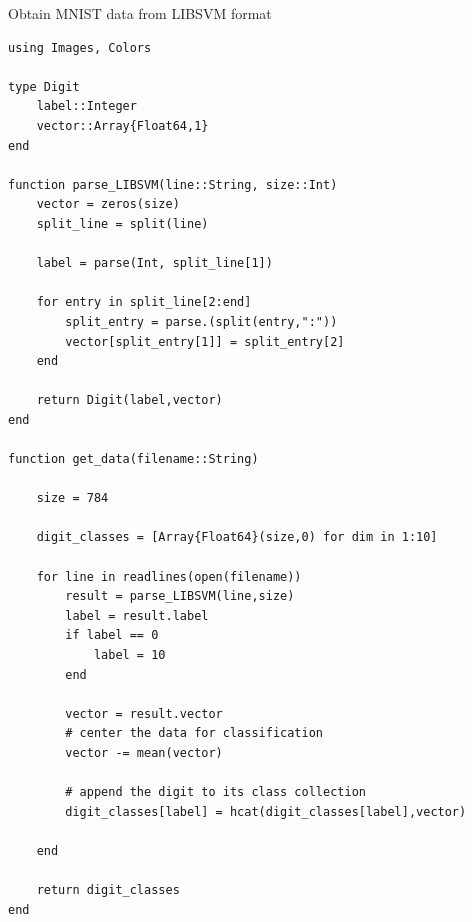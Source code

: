 \documentclass[a4paper]{article}
\begin{document}
\begin{algorithm}
\caption{Obtain MNIST data from LIBSVM format}

\begin{lstlisting}
using Images, Colors

type Digit
    label::Integer
    vector::Array{Float64,1}
end

function parse_LIBSVM(line::String, size::Int) 
    vector = zeros(size)
    split_line = split(line)

    label = parse(Int, split_line[1])

    for entry in split_line[2:end]
        split_entry = parse.(split(entry,":"))
        vector[split_entry[1]] = split_entry[2]
    end
    
    return Digit(label,vector)
end

function get_data(filename::String)

    size = 784

    digit_classes = [Array{Float64}(size,0) for dim in 1:10]

    for line in readlines(open(filename))
        result = parse_LIBSVM(line,size)
        label = result.label
        if label == 0
            label = 10
        end

        vector = result.vector
        # center the data for classification
        vector -= mean(vector)

        # append the digit to its class collection
        digit_classes[label] = hcat(digit_classes[label],vector)

    end
    
    return digit_classes
end
\end{lstlisting}

\end{algorithm}
\end{document}

